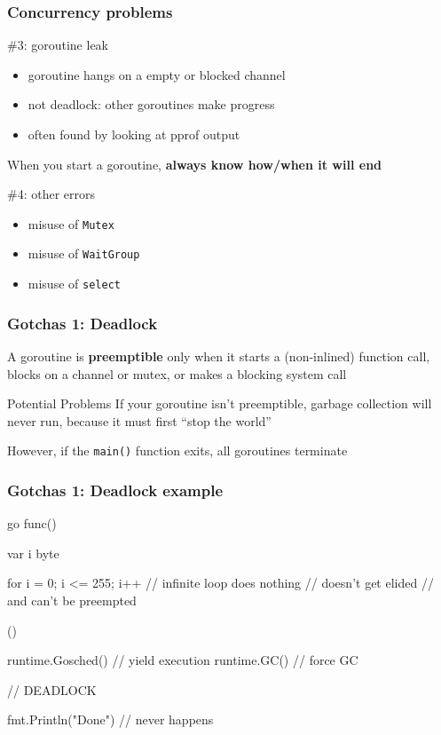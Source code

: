 \documentclass[handout,compress,t,11pt]{beamer}
\begin{document}
\begin{frame}[fragile]
    \frametitle{Concurrency problems}
    \#3: goroutine leak
    \begin{itemize}
        \item goroutine hangs on a empty or blocked channel
        \item not deadlock: other goroutines make progress
        \item often found by looking at pprof output
    \end{itemize}
    \vspace{0.6\baselineskip}
    When you start a goroutine, \alert{\bf always know how/when it will end} \par
    \vspace{1.4\baselineskip}
    \#4: other errors
    \begin{itemize}
        \item misuse of \verb|Mutex|
        \item misuse of \verb|WaitGroup|
        \item misuse of \verb|select|
    \end{itemize}
\end{frame}

\begin{frame}
    \frametitle{Gotchas 1: Deadlock}
    A goroutine is {\bf preemptible} only when it starts a (non-inlined)
    function call, blocks on a channel or mutex, or makes a blocking system call
    \vspace{\baselineskip}
\begin{alertblock}{Potential Problems}
    If your goroutine isn't preemptible, garbage collection will never run,
    because it must first ``stop the world''
\end{alertblock}
    \vspace{\baselineskip}
    However, if the {\tt main()} function exits, all goroutines terminate
\end{frame}

\begin{frame}[fragile]
    \frametitle{Gotchas 1: Deadlock example}
\begin{golang}
go func() {
    var i byte

    for i = 0; i <= 255; i++ {
        // infinite loop does nothing
        // doesn't get elided
        // and can't be preempted
    }
}()

runtime.Gosched()    // yield execution
runtime.GC()         // force GC

// DEADLOCK

fmt.Println("Done")  // never happens
\end{golang}
\end{frame}
\end{document}
